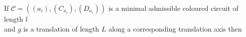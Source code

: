 \documentclass[preview]{standalone}
\begin{document}
\begin{center}
If $\mathcal{C} = ((a_i), (C_{a_i}), (D_{\overline{a_i}}))$ is a minimal admissible coloured circuit of length $l$ \\ and $g$ is a translation of length $L$ along a corresponding translation axis then
\end{center}
\end{document}
